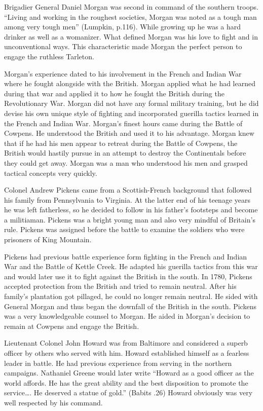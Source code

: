 Brigadier General Daniel Morgan was second in command of the southern troops.
“Living and working in the roughest societies, Morgan was noted as a tough man
among very tough men” (Lumpkin, p.116).  While growing up he was a hard drinker
as well as a womanizer. What defined Morgan was his love to fight and in
unconventional ways. This characteristic made Morgan the perfect person to
engage the ruthless Tarleton. 

Morgan’s experience dated to his involvement in the French and Indian War where
he fought alongside with the British.  Morgan applied what he had learned during
that war and applied it to how he fought the British during the Revolutionary
War.  Morgan did not have any formal military training, but he did devise his
own unique style of fighting and incorporated guerilla tactics learned in the
French and Indian War. Morgan’s finest hours came during the Battle of Cowpens.
He understood the British and used it to his advantage.  Morgan knew that if he
had his men appear to retreat during the Battle of Cowpens, the British would
hastily pursue in an attempt to destroy the Continentals before they could get
away.  Morgan was a man who  understood his men and grasped tactical concepts
very quickly.

Colonel Andrew Pickens came from a Scottish-French background that followed his
family from Pennsylvania to Virginia.  At the latter end of his teenage years he
was left fatherless, so he decided to follow in his father’s footsteps and
become a militiaman.  Pickens was a bright young man and also very mindful of
Britain’s rule.  Pickens was assigned before the battle to examine the soldiers
who were prisoners of King Mountain.

Pickens had previous battle experience form fighting in the French and Indian
War and the Battle of Kettle Creek. He adapted his guerilla tactics from this
war and would later use it to fight against the British in the south.  In 1780,
Pickens accepted protection from the British and tried to remain neutral.  After
his family’s plantation got pillaged, he could no longer remain neutral.  He
sided with General Morgan and thus began the downfall of the British in the
south. Pickens was a very knowledgeable counsel to Morgan.  He aided in Morgan’s
decision to remain at Cowpens and engage the British.  

Lieutenant Colonel John Howard was from Baltimore and considered a superb
officer by others who served with him.  Howard established himself as a fearless
leader in battle.  He had previous experience from serving in the northern
campaigns. Nathaniel Greene would later write “Howard as a good officer as the
world affords. He has the great ability and the best disposition to promote the
service…. He deserved a statue of gold.” (Babits .26) Howard obviously was very
well respected by his command. 

